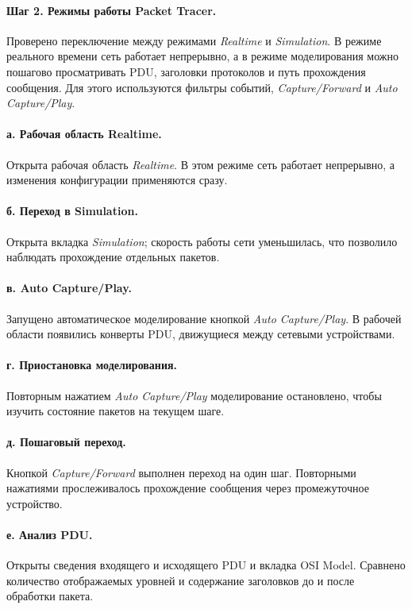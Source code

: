 \documentclass[a4paper,14pt,oneside]{extarticle}
\begin{document}
\paragraph{Шаг 2. Режимы работы Packet Tracer.}
Проверено переключение между режимами \textit{Realtime} и
\textit{Simulation}. В режиме реального времени сеть работает непрерывно,
а в режиме моделирования можно пошагово просматривать PDU, заголовки
протоколов и путь прохождения сообщения. Для этого используются фильтры
событий, \textit{Capture/Forward} и \textit{Auto Capture/Play}.

\paragraph{а. Рабочая область Realtime.}
Открыта рабочая область \textit{Realtime}. В этом режиме сеть работает
непрерывно, а изменения конфигурации применяются сразу.

\paragraph{б. Переход в Simulation.}
Открыта вкладка \textit{Simulation}; скорость работы сети уменьшилась,
что позволило наблюдать прохождение отдельных пакетов.

\paragraph{в. Auto Capture/Play.}
Запущено автоматическое моделирование кнопкой
\textit{Auto Capture/Play}. В рабочей области появились конверты PDU,
движущиеся между сетевыми устройствами.

\paragraph{г. Приостановка моделирования.}
Повторным нажатием \textit{Auto Capture/Play} моделирование остановлено,
чтобы изучить состояние пакетов на текущем шаге.

\paragraph{д. Пошаговый переход.}
Кнопкой \textit{Capture/Forward} выполнен переход на один шаг. Повторными
нажатиями прослеживалось прохождение сообщения через промежуточное
устройство.

\paragraph{е. Анализ PDU.}
Открыты сведения входящего и исходящего PDU и вкладка OSI Model.
Сравнено количество отображаемых уровней и содержание заголовков до и после
обработки пакета.
\end{document}
